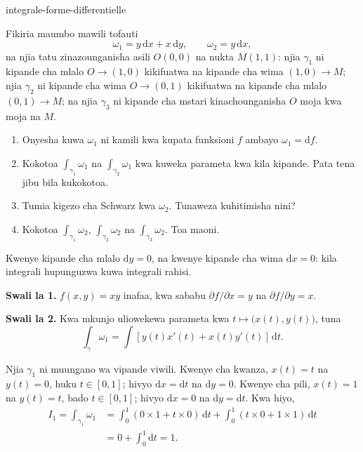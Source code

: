 
\begin{exo}{integrale-forme-differentielle}

Fikiria maumbo mawili tofauti
\[
\omega_1 = y\,\mathrm{d}x + x\,\mathrm{d}y,
\qquad
\omega_2 = y\,\mathrm{d}x,
\]
na njia tatu zinazounganisha asili $O(0,0)$ na nukta $M(1,1)$: njia
$\gamma_1$ ni kipande cha mlalo $O\to(1,0)$ kikifuatwa na kipande cha wima
$(1,0)\to M$; njia $\gamma_2$ ni kipande cha wima $O\to(0,1)$ kikifuatwa
na kipande cha mlalo $(0,1)\to M$; na njia $\gamma_3$ ni kipande cha mstari
kinachounganisha $O$ moja kwa moja na $M$.

\begin{enumerate}
\item Onyesha kuwa $\omega_1$ ni kamili kwa kupata funksioni $f$ ambayo $\omega_1=\mathrm{d}f$.
\item Kokotoa $\int_{\gamma_1}\omega_1$ na $\int_{\gamma_2}\omega_1$ kwa kuweka parameta kwa kila kipande. Pata tena jibu bila kukokotoa.
\item Tumia kigezo cha Schwarz kwa $\omega_2$. Tunaweza kuhitimisha nini?
\item Kokotoa $\int_{\gamma_1}\omega_2$, $\int_{\gamma_2}\omega_2$ na $\int_{\gamma_3}\omega_2$. Toa maoni.
\end{enumerate}

\begin{indication}
Kwenye kipande cha mlalo $\mathrm{d}y=0$, na kwenye kipande cha wima
$\mathrm{d}x=0$: kila integrali hupunguzwa kuwa integrali rahisi.
\end{indication}

\begin{solution}
\textbf{Swali la 1.} $f(x,y)=xy$ inafaa, kwa sababu $\partial f/\partial x=y$ na $\partial f/\partial y=x$.

\textbf{Swali la 2.} Kwa mkunjo uliowekewa parameta kwa
$t\mapsto\bigl(x(t),y(t)\bigr)$, tuna
\[
\int_\gamma\omega_1
= \int \left[y(t)x'(t)+x(t)y'(t)\right]\,\mathrm{d}t.
\]

Njia $\gamma_1$ ni muungano wa vipande viwili. Kwenye cha kwanza,
$x(t)=t$ na $y(t)=0$, huku $t\in[0,1]$; hivyo $\mathrm{d}x=\mathrm{d}t$
na $\mathrm{d}y=0$. Kwenye cha pili, $x(t)=1$ na $y(t)=t$, bado
$t\in[0,1]$; hivyo $\mathrm{d}x=0$ na $\mathrm{d}y=\mathrm{d}t$. Kwa hiyo,
\[
\begin{aligned}
I_1
= \int_{\gamma_1}\omega_1
&= \int_0^1\left(0\times 1+t\times 0\right)\,\mathrm{d}t
 + \int_0^1\left(t\times 0+1\times 1\right)\,\mathrm{d}t \\
&= 0+\int_0^1\mathrm{d}t = 1.
\end{aligned}
\]


\end{solution}
\end{exo}
